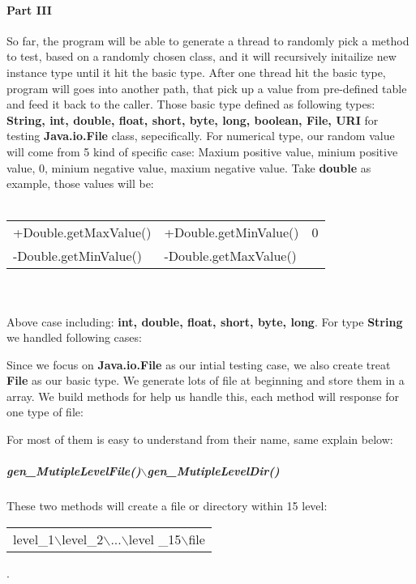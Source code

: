 \documentclass{article}
\begin{document}
\paragraph{Part III}
So far, the program will be able to generate a thread to randomly pick a method
 to test, based on a randomly chosen class, and it will recursively initailize
 new instance type until it hit the basic type. 
After one thread hit the basic type, program will goes into another path, that 
pick up a value from pre-defined table and feed it back to the caller. Those 
basic type defined as following types: {\bf \small \ttfamily 
String, int, double, float, short, byte, long, boolean, File, URI} for testing 
{\bf \small \ttfamily Java.io.File} class, sepecifically. For numerical type, 
our random value will come from 5 kind of specific case: Maxium positive 
value, minium positive value, 0, minium negative value, maxium negative value. 
Take {\bf \small \ttfamily double} as example, those values will be: \\ \\
{\bf \small \ttfamily 
\begin{tabular}{lll}
+Double.getMaxValue() & +Double.getMinValue() & 0 \\
-Double.getMinValue() & -Double.getMaxValue() & ~ \\
\end{tabular} } \\\\
Above case including: {\bf \small \ttfamily int, double, float, short, byte, 
long}. For type {\bf \small \ttfamily String} we handled following cases:
\begin{multicols}{2}

\end{multicols}
Since we focus on {\bf\small\ttfamily Java.io.File} as our intial testing case, 
we also create treat {\bf\small\ttfamily File} as our basic type. We generate 
lots of file at beginning and store them in a array. We build methods for help 
us handle this, each method will response for one type of file:

For most of them is easy to understand from their name, same explain below:

\subparagraph{\bf\small\ttfamily gen\_MutipleLevelFile()$\backslash$gen\_MutipleLevelDir()} 
These two methods will create a file or directory within 15 level:
{\bf\small\ttfamily
\begin{tabular}{l}
level\_1$\backslash$level\_2$\backslash$...$\backslash$level
\_15$\backslash$file\\
\end{tabular}}. \\
\end{document}
